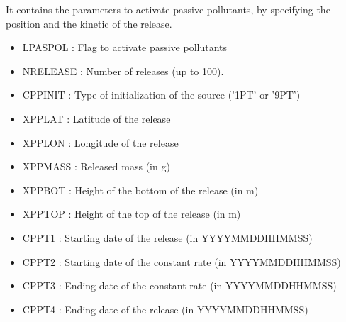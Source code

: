 It contains the parameters to activate passive pollutants, by specifying the position and the kinetic of the release. 
\begin{itemize}
\item LPASPOL  :
Flag to activate passive pollutants                                            
\item NRELEASE :
Number of releases (up to 100).                                                                                                    
\item CPPINIT :
Type of initialization of the source ('1PT' or '9PT')          
\item XPPLAT :
Latitude of the release                      
\item XPPLON :
Longitude of the release                      
\item XPPMASS :
Released mass (in g)                         
\item XPPBOT :
Height of the bottom of the release (in m)          
\item XPPTOP :
Height of the top of the release (in m)        
\item CPPT1 :
Starting date of the release (in YYYYMMDDHHMMSS)        
\item CPPT2 :
Starting date of the constant rate (in YYYYMMDDHHMMSS)        
\item CPPT3 :
Ending date of the constant rate (in YYYYMMDDHHMMSS)        
\item CPPT4 :
Ending date of the release (in YYYYMMDDHHMMSS)        
\end{itemize}
